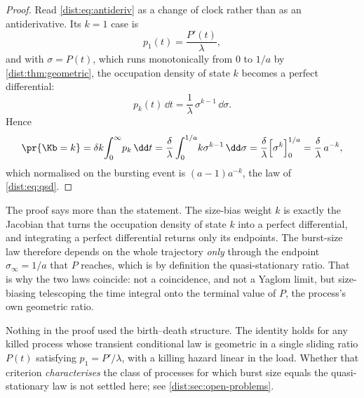 \begin{proof}
Read \cref{dist:eq:antideriv} as a change of clock rather than as an
antiderivative. Its $k=1$ case is
\begin{equation}
p_1(t)=\frac{P'(t)}{\lambda},
\label{dist:eq:ponelaw}
\end{equation}
and with $\sigma=P(t)$, which runs monotonically from $0$ to $1/a$ by
\cref{dist:thm:geometric}, the occupation density of state $k$ becomes a
perfect differential:
\begin{equation}
p_k(t)\,\dd t=\frac{1}{\lambda}\,\sigma^{k-1}\,\dd\sigma .
\label{dist:eq:clockchange}
\end{equation}
Hence
\begin{equation}
\pr{\Kb=k}=\delta k\!\int_0^\infty\! p_k\,\dd t
=\frac{\delta}{\lambda}\int_0^{1/a}\! k\sigma^{k-1}\,\dd\sigma
=\frac{\delta}{\lambda}\Bigl[\sigma^k\Bigr]_0^{1/a}
=\frac{\delta}{\lambda}\,a^{-k},
\label{dist:eq:telescope}
\end{equation}
which normalised on the bursting event is $(a-1)a^{-k}$, the law of
\cref{dist:eq:qsd}.
\end{proof}

The proof says more than the statement. The size-bias weight $k$ is exactly
the Jacobian that turns the occupation density of state $k$ into a perfect
differential, and integrating a perfect differential returns only its
endpoints. The burst-size law therefore depends on the whole trajectory
\emph{only} through the endpoint $\sigma_\infty=1/a$ that $P$ reaches, which
is by definition the quasi-stationary ratio. That is why the two laws
coincide: not a coincidence, and not a Yaglom limit, but size-biasing
telescoping the time integral onto the terminal value of $P$, the process's
own geometric ratio.

\begin{remark}
\label{dist:rem:criterion}
Nothing in the proof used the birth--death structure. The identity holds for
any killed process whose transient conditional law is geometric in a single
sliding ratio $P(t)$ satisfying $p_1=P'/\lambda$, with a killing hazard
linear in the load. Whether that criterion \emph{characterises} the class of
processes for which burst size equals the quasi-stationary law is not settled
here; see \cref{dist:sec:open-problems}.
\end{remark}

